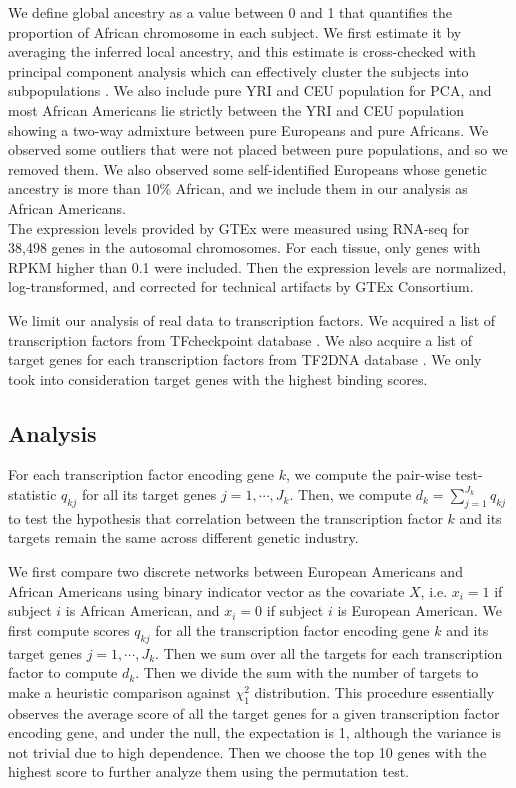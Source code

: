 \documentclass[aoas,preprint]{imsart}
\numberwithin{equation}{section}
\theoremstyle{plain}
\begin{document}
 We define global ancestry as a value between 0 and 1 that quantifies the proportion of African chromosome in each subject. We first estimate it by averaging the inferred local ancestry, and this estimate is cross-checked with principal component analysis which can effectively cluster the subjects into subpopulations \cite{pritchard2000inference}. We also include pure YRI and CEU population for PCA, and most African Americans lie strictly between the YRI and CEU population showing a two-way admixture between pure Europeans and pure Africans. We observed some outliers that were not placed between pure populations, and so we removed them. We also observed some self-identified Europeans whose genetic ancestry is more than 10\% African, and we include them in our analysis as African Americans. \\

 The expression levels provided by GTEx were measured using RNA-seq for 38,498 genes in the autosomal chromosomes. For each tissue, only genes with RPKM higher than 0.1 were included. Then the expression levels are normalized, log-transformed, and corrected for technical artifacts by GTEx Consortium. \bigskip

We limit our analysis of real data to transcription factors. We acquired a list of transcription factors from TFcheckpoint database \cite{chawla2013tfcheckpoint}. We also acquire a list of target genes for each transcription factors from TF2DNA database \cite{pujato2014prediction}. We only took into consideration target genes with the highest binding scores. \bigskip

\subsection{Analysis}
 For each transcription factor encoding gene $k$, we compute the pair-wise test-statistic $q_{kj}$ for all its target genes $j = 1, \cdots, J_k$. Then, we compute $d_k = \sum_{j=1}^{J_k} q_{kj}$ to test the hypothesis that correlation between the transcription factor $k$ and its targets remain the same across different genetic industry.\bigskip

 We first compare two discrete networks between European Americans and African Americans using binary indicator vector as the covariate $X$, i.e. $x_i = 1$ if subject $i$ is African American, and $x_i =0 $ if subject $i$ is European American. We first compute scores $q_{kj}$ for all the transcription factor encoding gene $k$ and its target genes $j = 1, \cdots, J_k$. Then we sum over all the targets for each transcription factor to compute $d_k$. Then we divide the sum with the number of targets to make a heuristic comparison against $\chi_1^2$ distribution. This procedure essentially observes the average score of all the target genes for a given transcription factor encoding gene, and under the null, the expectation is 1, although the variance is not trivial due to high dependence. Then we choose the top 10 genes with the highest score to further analyze them using the permutation test.\bigskip
\end{document}
